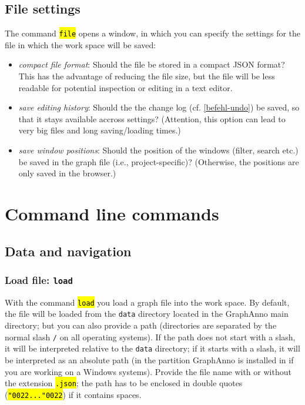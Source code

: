 \documentclass[12pt]{scrartcl}
\newcommand{\quo}{\char"0022}
\newcommand{\code}[1]{\hl{\texttt{#1}}}
\begin{document}
\subsection{File settings}\label{filesettings}

The command \code{file} opens a window, in which you can specify the settings for the file in which the work space will be saved:

\begin{itemize}
	\item	\textit{compact file format}: Should the file be stored in a compact JSON format?
			This has the advantage of reducing the file size, but the file will be less readable for potential inspection or editing in a text editor.
	\item	\textit{save editing history}: Should the the change log (cf. \ref{befehl-undo}) be saved, so that it stays available accross settings?
			(Attention, this option can lead to very big files and long saving/loading times.)
	\item	\textit{save window positions}: Should the position of the windows (filter, search etc.) be saved in the graph file (i.e., project-specific)?
			(Otherwise, the positions are only saved in the browser.)
\end{itemize}



\section{Command line commands}\label{commandline-commands}

\subsection{Data and navigation}

\subsubsection{Load file: \texttt{load}}

With the command \code{load} you load a graph file into the work space.
By default, the file will be loaded from the \texttt{data} directory located in the GraphAnno main directory; but you can also provide a path (directories are separated by the normal slash \texttt{/} on all operating systems).
If the path does not start with a slash, it will be interpreted relative to the \texttt{data} directory; if it starts with a slash, it will be interpreted as an absolute path (in the partition GraphAnno is installed in if you are working on a Windows systems).
Provide the file name with or without the extension \code{.json}; the path has to be enclosed in double quotes (\code{\quo...\quo}) if it contains spaces.
\end{document}
